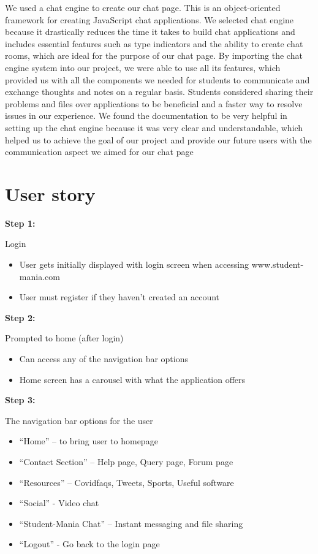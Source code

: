We used a chat engine\cite{ref24} to create our chat page. This is an object-oriented framework for creating JavaScript chat applications. We selected chat engine because it drastically reduces the time it takes to build chat applications and includes essential features such as type indicators and the ability to create chat rooms, which are ideal for the purpose of our chat page.
By importing the chat engine system into our project, we were able to use all its features, which provided us with all the components we needed for students to communicate and exchange thoughts and notes on a regular basis. Students considered sharing their problems and files over applications to be beneficial and a faster way to resolve issues in our experience.
We found the documentation to be very helpful in setting up the chat engine because it was very clear and understandable, which helped us to achieve the goal of our project and provide our future users with the communication aspect we aimed for our chat page



\section{User story}


\textbf{Step 1:}\hfill \break

Login

\begin{itemize}
  \item User gets initially displayed with login screen when accessing www.student-mania.com
  \item User must register if they haven't created an account
\end{itemize}
	

\textbf{Step 2:}\hfill \break

Prompted to home (after login)

\begin{itemize}
  \item Can access any of the navigation bar options
  \item Home screen has a carousel with what the application offers
\end{itemize}

\textbf{Step 3:} \hfill \break

The navigation bar options for the user

\begin{itemize}
  \item  “Home” – to bring user to homepage
  \item  “Contact Section” – Help page, Query page, Forum page
  \item  “Resources” – Covidfaqs, Tweets, Sports, Useful software
  \item  “Social” - Video chat
  \item  “Student-Mania Chat” – Instant messaging and file sharing
  \item  “Logout” - Go back to the login page
\end{itemize}


